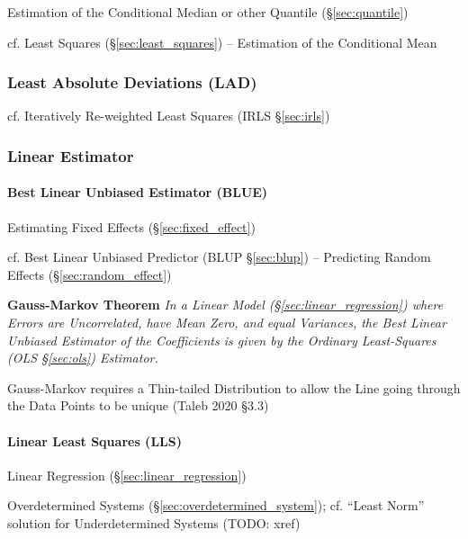 Estimation of the Conditional Median or other Quantile (\S\ref{sec:quantile})

cf. Least Squares (\S\ref{sec:least_squares}) -- Estimation of the Conditional
Mean



\subsubsection{Least Absolute Deviations (LAD)}\label{sec:lad}

cf. Iteratively Re-weighted Least Squares (IRLS \S\ref{sec:irls})



\subsubsection{Linear Estimator}\label{sec:linear_estimator}\hfill




\paragraph{Best Linear Unbiased Estimator (BLUE)}\label{sec:blue}\hfill

Estimating Fixed Effects (\S\ref{sec:fixed_effect})

cf. Best Linear Unbiased Predictor (BLUP \S\ref{sec:blup})
-- Predicting Random Effects (\S\ref{sec:random_effect})

\textbf{Gauss-Markov Theorem} \emph{
  In a Linear Model (\S\ref{sec:linear_regression}) where Errors are
  Uncorrelated, have Mean Zero, and equal Variances, the Best Linear Unbiased
  Estimator of the Coefficients is given by the Ordinary Least-Squares (OLS
  \S\ref{sec:ols}) Estimator.
}

Gauss-Markov requires a Thin-tailed Distribution to allow the Line going
through the Data Points to be unique (Taleb 2020 \S 3.3)



\paragraph{Linear Least Squares (LLS)}\label{sec:lls}\hfill

Linear Regression (\S\ref{sec:linear_regression})

Overdetermined Systems (\S\ref{sec:overdetermined_system}); cf. ``Least Norm''
solution for Underdetermined Systems (TODO: xref)

